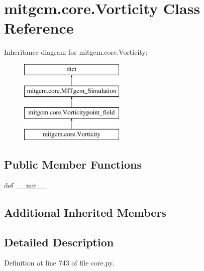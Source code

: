 \hypertarget{classmitgcm_1_1core_1_1Vorticity}{\section{mitgcm.\+core.\+Vorticity Class Reference}
\label{classmitgcm_1_1core_1_1Vorticity}
}
Inheritance diagram for mitgcm.\+core.\+Vorticity\+:\begin{figure}[H]
\begin{center}
\leavevmode
\includegraphics[height=4.000000cm]{classmitgcm_1_1core_1_1Vorticity}
\end{center}
\end{figure}
\subsection*{Public Member Functions}
\begin{DoxyCompactItemize}
\item 
def \hyperlink{classmitgcm_1_1core_1_1Vorticity_a43bff58c89253c8425aef49b7ab37e2d}{\+\_\+\+\_\+init\+\_\+\+\_\+}
\end{DoxyCompactItemize}
\subsection*{Additional Inherited Members}


\subsection{Detailed Description}


Definition at line 743 of file core.\+py.



